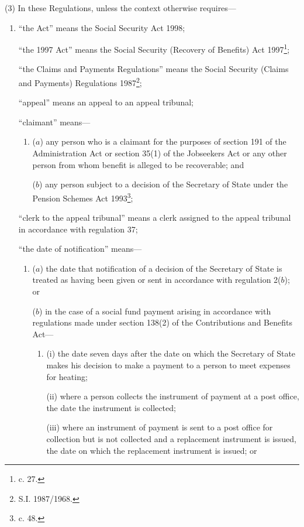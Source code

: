\documentclass[12pt,a4paper]{article}
\begin{document}
(3) In these Regulations, unless the context otherwise requires—
\begin{enumerate}\item[]
“the Act” means the Social Security Act 1998;

“the 1997 Act” means the Social Security (Recovery of Benefits) Act 1997\footnote{ c. 27.};

“the Claims and Payments Regulations” means the Social Security (Claims and Payments) Regulations 1987\footnote{\frenchspacing S.I. 1987/1968.};

“appeal” means an appeal to an appeal tribunal;

“claimant” means—
\begin{enumerate}\item[]
($a$) any person who is a claimant for the purposes of section 191 of the Administration Act or section 35(1) of the Jobseekers Act or any other person from whom benefit is alleged to be recoverable; and

($b$) any person subject to a decision of the Secretary of State under the Pension Schemes Act 1993\footnote{ c. 48.};
\end{enumerate}

“clerk to the appeal tribunal” means a clerk assigned to the appeal tribunal in accordance with regulation 37;

“the date of notification” means—
\begin{enumerate}\item[]
($a$) the date that notification of a decision of the Secretary of State is treated as having been given or sent in accordance with regulation 2($b$); or

($b$) in the case of a social fund payment arising in accordance with regulations made under section 138(2) of the Contributions and Benefits Act—
\begin{enumerate}\item[]
(i) the date seven days after the date on which the Secretary of State makes his decision to make a payment to a person to meet expenses for heating;

(ii) where a person collects the instrument of payment at a post office, the date the instrument is collected;

(iii) where an instrument of payment is sent to a post office for collection but is not collected and a replacement instrument is issued, the date on which the replacement instrument is issued; or


\end{enumerate}
\end{enumerate}
\end{enumerate}
\end{document}
